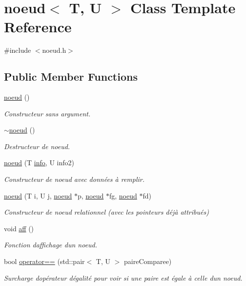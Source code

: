 \hypertarget{classnoeud}{}\section{noeud$<$ T, U $>$ Class Template Reference}
\label{classnoeud}


{\ttfamily \#include $<$noeud.\+h$>$}

\subsection*{Public Member Functions}
\begin{DoxyCompactItemize}
\item 
\hyperlink{classnoeud_ad68daacd6bece9b3358ffce75ba4fcb3}{noeud} ()
\begin{DoxyCompactList}\small\item\em Constructeur sans argument. \end{DoxyCompactList}\item 
\hyperlink{classnoeud_a75bb30950411d77e2cf47b97eb575e96}{$\sim$noeud} ()
\begin{DoxyCompactList}\small\item\em Destructeur de noeud. \end{DoxyCompactList}\item 
\hyperlink{classnoeud_a70ef2fae1a2b747fd5520220073f142a}{noeud} (T \hyperlink{classnoeud_ad6e70a2d7350a11040d53468eaa40510}{info}, U info2)
\begin{DoxyCompactList}\small\item\em Constructeur de noeud avec données à remplir. \end{DoxyCompactList}\item 
\hyperlink{classnoeud_af0e9231a1505f8ca9e563d728e830f30}{noeud} (T i, U j, \hyperlink{classnoeud}{noeud} $\ast$p, \hyperlink{classnoeud}{noeud} $\ast$fg, \hyperlink{classnoeud}{noeud} $\ast$fd)
\begin{DoxyCompactList}\small\item\em Constructeur de noeud relationnel (avec les pointeurs déjà attribués) \end{DoxyCompactList}\item 
void \hyperlink{classnoeud_af6f7f3eb0fa5e063f4fafce09eada25e}{aff} ()
\begin{DoxyCompactList}\small\item\em Fonction d\textquotesingle{}affichage d\textquotesingle{}un noeud. \end{DoxyCompactList}\item 
bool \hyperlink{classnoeud_a2a6e29d59b713f170ca6bf72d2622ee9}{operator==} (std\+::pair$<$ T, U $>$ paire\+Comparee)
\begin{DoxyCompactList}\small\item\em Surcharge d\textquotesingle{}opérateur d\textquotesingle{}égalité pour voir si une paire est égale à celle d\textquotesingle{}un noeud. \end{DoxyCompactList}\end{DoxyCompactItemize}
